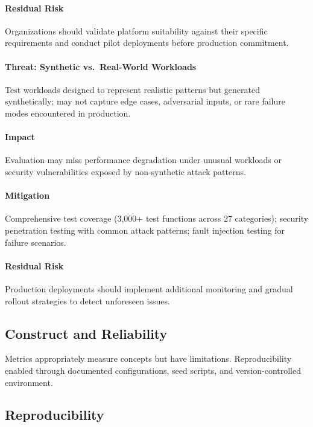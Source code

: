 \documentclass[a4paper,twoside]{sapthesis}
\newcommand{\TestCount}{3,000+}
\begin{document}
\paragraph{Residual Risk}
Organizations should validate platform suitability against their specific requirements and conduct pilot deployments before production commitment.

\paragraph{Threat: Synthetic vs.\ Real-World Workloads}
Test workloads designed to represent realistic patterns but generated synthetically; may not capture edge cases, adversarial inputs, or rare failure modes encountered in production.

\paragraph{Impact}
Evaluation may miss performance degradation under unusual workloads or security vulnerabilities exposed by non-synthetic attack patterns.

\paragraph{Mitigation}
Comprehensive test coverage (\TestCount{} test functions across 27 categories); security penetration testing with common attack patterns; fault injection testing for failure scenarios.

\paragraph{Residual Risk}
Production deployments should implement additional monitoring and gradual rollout strategies to detect unforeseen issues.

\subsection{Construct and Reliability}

Metrics appropriately measure concepts but have limitations. Reproducibility enabled through documented configurations, seed scripts, and version-controlled environment.

\subsection{Reproducibility}
\end{document}
